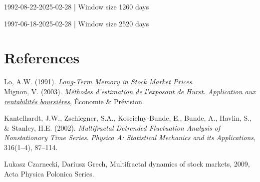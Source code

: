 \documentclass[11pt]{extarticle}
\begin{document}
\begin{table}[!h]
    \centering
    \caption{1992-08-22-2025-02-28 | Window size 1260 days}
    \label{tab:performance_table_window_1260}
\end{table}
\FloatBarrier

\begin{table}[!h]
    \centering
    \caption{1997-06-18-2025-02-28 | Window size 2520 days}
    \label{tab:performance_table_window_2520}
\end{table}
\FloatBarrier

\section{References}

Lo, A.W. (1991). \textit{\href{http://www.e-m-h.org/Lo\_\_91.pdf}{Long-Term Memory in Stock Market Prices}}. \\

Mignon, V. (2003). \textit{\href{https://www.persee.fr/doc/ecop_0249-4744_1998_num_132_1_5909}{Méthodes d'estimation de l'exposant de Hurst. Application aux rentabilités boursières}}, Économie \& Prévision.

Kantelhardt, J.W., Zschiegner, S.A., Koscielny-Bunde, E., Bunde, A., Havlin, S., \& Stanley, H.E. (2002). \textit{Multifractal Detrended Fluctuation Analysis of Nonstationary Time Series}. \textit{Physica A: Statistical Mechanics and its Applications}, 316(1--4), 87--114.

Lukasz Czarnecki, Dariusz Grech, Multifractal dynamics of stock markets, 2009, Acta Physica Polonica Series.
\end{document}
